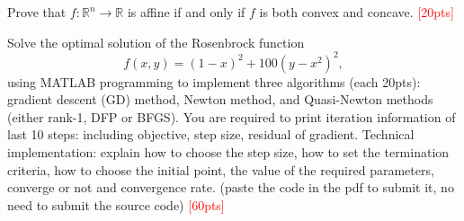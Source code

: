 \documentclass[10pt]{article}
\newenvironment{problem}[2][Problem]{\begin{trivlist}
\item[\hskip \labelsep {\bfseries #1}\hskip \labelsep {\bfseries #2.}]}{\end{trivlist}}
\begin{document}
\newpage

\begin{problem}{2}
    Prove that $f: \mathbb{R}^n \rightarrow \mathbb{R}$ is affine if and only if $f$ is both convex and concave. \textcolor{red}{[20pts]} 
\end{problem}



\newpage

\begin{problem}{3}
    Solve the optimal solution of the Rosenbrock function $$f(x, y) = (1 - x)^2 + 100(y - x^2)^2, $$ using MATLAB programming to implement three algorithms (each 20pts): gradient descent (GD) method, Newton method, and Quasi-Newton methods (either rank-1, DFP or BFGS). You are required to print iteration information of last 10 steps: including objective, step size, residual of gradient. Technical implementation: explain how to choose the step size, how to set the termination criteria, how to choose the initial point, the value of the required parameters, converge or not and convergence rate. (paste the code in the pdf to submit it, no need to submit the source code) \textcolor{red}{[60pts]}
\end{problem}


	











\end{document}

